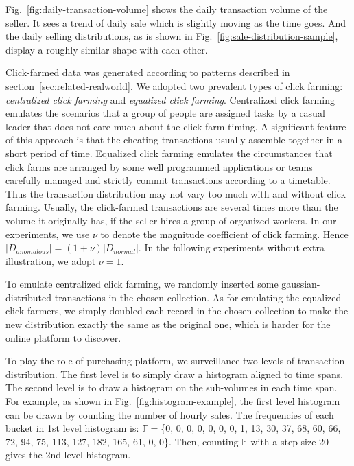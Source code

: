 \documentclass[10pt,conference,letterpaper]{IEEEtran}
\begin{document}
			Fig.~\ref{fig:daily-transaction-volume} shows the daily transaction volume of the seller. It sees a trend of daily sale which is slightly moving as the time goes. And the daily selling distributions, as is shown in Fig.~\ref{fig:sale-distribution-sample}, display a roughly similar shape with each other.
			
			Click-farmed data was generated according to patterns described in section~\ref{sec:related-realworld}. We adopted two prevalent types of click farming: \textit{centralized click farming} and \textit{equalized click farming}. Centralized click farming emulates the scenarios that a group of people are assigned tasks by a casual leader that does not care much about the click farm timing. A significant feature of this approach is that the cheating transactions usually assemble together in a short period of time. Equalized click farming emulates the circumstances that click farms are arranged by some well programmed applications or teams carefully managed and strictly commit transactions according to a timetable. Thus the transaction distribution may not vary too much with and without click farming. 
			Usually, the click-farmed transactions are several times more than the volume it originally has, if the seller hires a group of organized workers. In our experiments, we use $\nu$ to denote the magnitude coefficient of click farming. Hence $|D_{anomalous}| = (1 + \nu)|D_{normal}|$. In the following experiments without extra illustration, we adopt $\nu = 1$.
	
			To emulate centralized click farming, we randomly inserted some gaussian-distributed transactions in the chosen collection. As for emulating the equalized click farmers, we simply doubled each record in the chosen collection to make the new distribution exactly the same as the original one, which is harder for the online platform to discover.
			
			To play the role of purchasing platform, we surveillance two levels of transaction distribution. The first level is to simply draw a histogram aligned to time spans. The second level is to draw a histogram on the sub-volumes in each time span. For example, as shown in Fig.~\ref{fig:histogram-example}, the first level histogram can be drawn by counting the number of hourly sales. The frequencies of each bucket in 1st level histogram is: $\mathbb{F}=$\{0, 0, 0, 0, 0, 0, 0, 1, 13, 30, 37, 68, 60, 66, 72, 94, 75, 113, 127, 182, 165, 61, 0, 0\}. Then, counting $\mathbb{F}$ with a step size 20 gives the 2nd level histogram.
	
\end{document}
